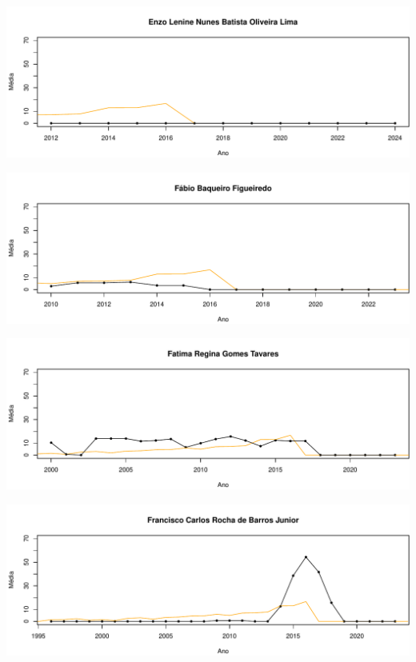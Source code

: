 \documentclass[12pt,brazil]{article}\usepackage[]{graphicx}\usepackage[]{xcolor}
\makeatletter
\def\maxwidth{ %
  \ifdim\Gin@nat@width>\linewidth
    \linewidth
  \else
    \Gin@nat@width
  \fi
}
\makeatother
\begin{document}
\vspace{0.5cm}


{\centering \includegraphics[width=\maxwidth]{figure/mediamovel-23} 

}



\vspace{0.5cm}


{\centering \includegraphics[width=\maxwidth]{figure/mediamovel-24} 

}



\vspace{0.5cm}


{\centering \includegraphics[width=\maxwidth]{figure/mediamovel-25} 

}



\vspace{0.5cm}


{\centering \includegraphics[width=\maxwidth]{figure/mediamovel-26} 

}
\end{document}
